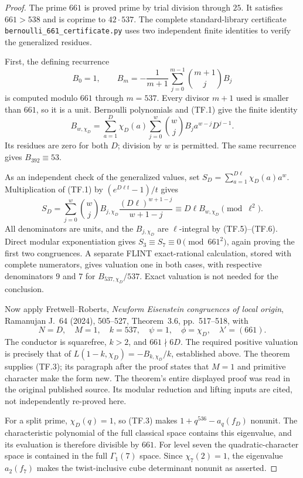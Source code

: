 \begin{proof}
The prime $661$ is proved prime by trial division through
$25$. It satisfies $661>538$ and is coprime to $42\cdot537$.
The complete standard-library certificate
\texttt{bernoulli\_661\_certificate.py} uses two independent
finite identities to verify the generalized residues.

First, the defining recurrence
\[
 B_0=1,\qquad
 B_m=-\frac1{m+1}\sum_{j=0}^{m-1}\binom{m+1}{j}B_j
                                                               \tag{TF.5}
\]
is computed modulo $661$ through $m=537$. Every divisor
$m+1$ used is smaller than $661$, so it is a unit.
Bernoulli polynomials and (TF.1) give the finite identity
\[
 B_{w,\chi_D}
   =\sum_{a=1}^{D}\chi_D(a)
     \sum_{j=0}^{w}\binom wj B_j a^{w-j}D^{j-1}.
                                                               \tag{TF.6}
\]
Its residues are zero for both $D$; division by $w$ is
permitted. The same recurrence gives $B_{392}\equiv53$.

As an independent check of the generalized values, set
$S_D=\sum_{a=1}^{D\ell}\chi_D(a)a^w$.
Multiplication of (TF.1) by $(e^{D\ell t}-1)/t$ gives
\[
 S_D=\sum_{j=0}^{w}\binom wj B_{j,\chi_D}
             \frac{(D\ell)^{w+1-j}}{w+1-j}
       \equiv D\ell B_{w,\chi_D}\pmod{\ell^2}.
                                                               \tag{TF.7}
\]
All denominators are units, and the $B_{j,\chi_D}$ are
$\ell$-integral by (TF.5)--(TF.6). Direct modular exponentiation
gives $S_3\equiv S_7\equiv0\pmod{661^2}$, again proving
the first two congruences. A separate FLINT exact-rational
calculation, stored with complete numerators, gives
valuation one in both cases, with respective denominators
$9$ and $7$ for $B_{537,\chi_D}/537$. Exact valuation is
not needed for the conclusion.

Now apply Fretwell--Roberts, \emph{Newform Eisenstein
congruences of local origin}, Ramanujan J.~64 (2024),
505--527, Theorem~3.6, pp.~517--518, with
\[
 N=D,\quad M=1,\quad k=537,\quad
 \psi=1,\quad\phi=\chi_D,\quad\lambda'=(661).
\]
The conductor is squarefree, $k>2$, and $661\nmid6D$.
The required positive valuation is precisely that of
$L(1-k,\chi_D)=-B_{k,\chi_D}/k$, established above.
The theorem supplies (TF.3); its paragraph after the proof
states that $M=1$ and primitive character make the form new.
The theorem's entire displayed proof was read in the original
published source. Its modular reduction and lifting inputs
are cited, not independently re-proved here.

For a split prime, $\chi_D(q)=1$, so (TF.3) makes
$1+q^{536}-a_q(f_D)$ nonunit. The characteristic polynomial
of the full classical space contains this eigenvalue,
and its evaluation is therefore divisible by $661$.
For level seven the quadratic-character space is contained
in the full $\Gamma_1(7)$ space. Since $\chi_7(2)=1$,
the eigenvalue $a_2(f_7)$ makes the twist-inclusive cube
determinant nonunit as asserted.


\end{proof}
